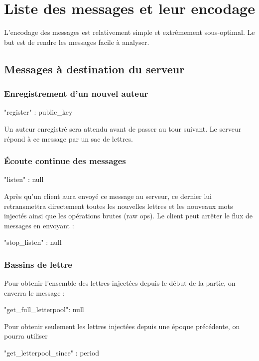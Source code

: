\documentclass{article}
\begin{document}
\section{Liste des messages et leur encodage}
\label{sec:liste-des-messages}

L'encodage des messages est relativement simple et extrêmement
sous-optimal. Le but est de rendre les messages facile à analyser.

\subsection{Messages à destination du serveur}
\label{sec:mess-vers-serv}

\subsubsection{Enregistrement d'un nouvel auteur}
\label{sec:register}

\begin{jsonMessage}
  { "register" : public_key }
\end{jsonMessage}
Un auteur enregistré sera attendu avant de passer au tour suivant. Le
serveur répond à ce message par un sac de lettres.

\subsubsection{Écoute continue des messages}
\label{sec:ecoute-continue}
\begin{jsonMessage}
  { "listen" : null }
\end{jsonMessage}
Après qu'un client aura envoyé ce message au serveur, ce dernier lui
retransmettra directement toutes les nouvelles lettres et les nouveaux
mots injectés ainsi que les opérations brutes (raw ops).  Le client
peut arrêter le flux de messages en envoyant :
\begin{jsonMessage}
  { "stop_listen" : null }
\end{jsonMessage}

\subsubsection{Bassins de lettre}
\label{sec:bassins-de-lettre}
Pour obtenir l'ensemble des lettres injectées depuis le début de la
partie, on enverra le message :
\begin{jsonMessage}
  { "get_full_letterpool": null}
\end{jsonMessage}
Pour obtenir seulement les lettres injectées depuis une époque
précédente, on pourra utiliser
\begin{jsonMessage}
  { "get_letterpool_since" : period }
\end{jsonMessage}
\end{document}
